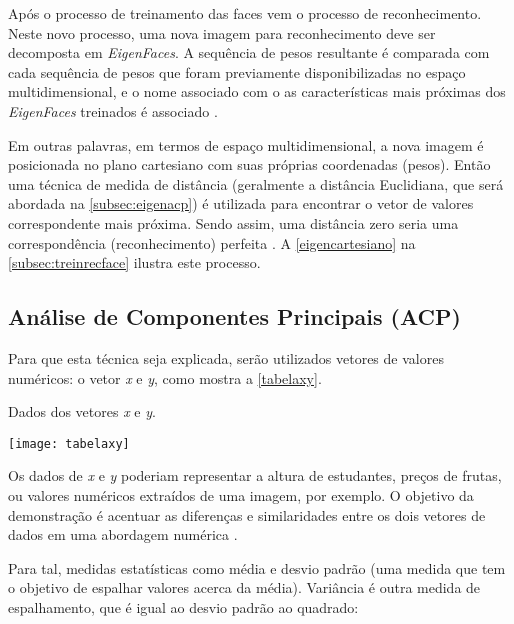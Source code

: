 Após o processo de treinamento das faces vem o processo de reconhecimento. Neste novo processo, uma nova imagem para reconhecimento deve ser decomposta em \textit{EigenFaces}. A sequência de pesos resultante é comparada com cada sequência de pesos que foram previamente disponibilizadas no espaço multidimensional, e o nome associado com o as características mais próximas dos \textit{EigenFaces} treinados é associado \cite{drmathew_java_programming}.

Em outras palavras, em termos de espaço multidimensional, a nova imagem é posicionada no plano cartesiano com suas próprias coordenadas (pesos). Então uma técnica de medida de distância (geralmente a distância Euclidiana, que será abordada na \autoref{subsec:eigenacp}) é utilizada para encontrar o vetor de valores correspondente mais próxima. Sendo assim, uma distância zero seria uma correspondência (reconhecimento) perfeita \cite{drmathew_java_programming}. A \autoref{eigencartesiano} na \autoref{subsec:treinrecface} ilustra este processo.



\subsection{Análise de Componentes Principais (ACP)}\label{subsec:acp}

Para que esta técnica seja explicada, serão utilizados vetores de valores numéricos: o vetor \textit{x} e \textit{y}, como mostra a \autoref{tabelaxy}.

\begin{table}[h]
	\centering
	\caption{Dados dos vetores \textit{x} e \textit{y}.}
	\texttt{[image: tabelaxy]}
	\label{tabelaxy}
\end{table}

Os dados de \textit{x} e \textit{y} poderiam representar a altura de estudantes, preços de frutas, ou valores numéricos extraídos de uma imagem, por exemplo. O objetivo da demonstração é acentuar as diferenças e similaridades entre os dois vetores de dados em uma abordagem numérica \cite{drmathew_java_programming}. 

Para tal, medidas estatísticas como média e desvio padrão (uma medida que tem o objetivo de espalhar valores acerca da média). Variância é outra medida de espalhamento, que é igual ao desvio padrão ao quadrado:


